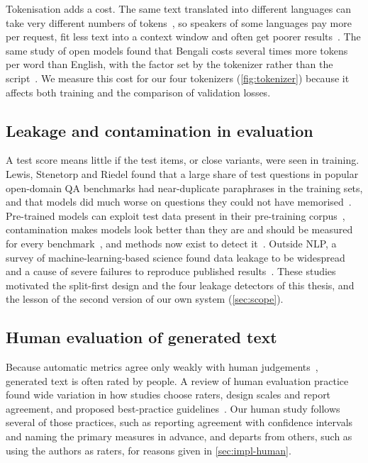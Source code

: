 Tokenisation adds a cost. The same text translated into different languages can take very different numbers of tokens~\cite{petrov2023language}, so speakers of some languages pay more per request, fit less text into a context window and often get poorer results~\cite{ahia2023all}. The same study of open models found that Bengali costs several times more tokens per word than English, with the factor set by the tokenizer rather than the script~\cite{bhowmik2025script}. We measure this cost for our four tokenizers (\cref{fig:tokenizer}) because it affects both training and the comparison of validation losses.

\subsection{Leakage and contamination in evaluation}
\label{sec:rev-leakage}

A test score means little if the test items, or close variants, were seen in training. Lewis, Stenetorp and Riedel found that a large share of test questions in popular open-domain QA benchmarks had near-duplicate paraphrases in the training sets, and that models did much worse on questions they could not have memorised~\cite{lewis2021question}. Pre-trained models can exploit test data present in their pre-training corpus~\cite{magar2022data}, contamination makes models look better than they are and should be measured for every benchmark~\cite{sainz2023nlp}, and methods now exist to detect it~\cite{golchin2024time}. Outside NLP, a survey of machine-learning-based science found data leakage to be widespread and a cause of severe failures to reproduce published results~\cite{kapoor2023leakage}. These studies motivated the split-first design and the four leakage detectors of this thesis, and the lesson of the second version of our own system (\cref{sec:scope}).

\subsection{Human evaluation of generated text}
\label{sec:rev-human}

Because automatic metrics agree only weakly with human judgements~\cite{novikova2017why}, generated text is often rated by people. A review of human evaluation practice found wide variation in how studies choose raters, design scales and report agreement, and proposed best-practice guidelines~\cite{vanderlee2021human}. Our human study follows several of those practices, such as reporting agreement with confidence intervals and naming the primary measures in advance, and departs from others, such as using the authors as raters, for reasons given in \cref{sec:impl-human}.

